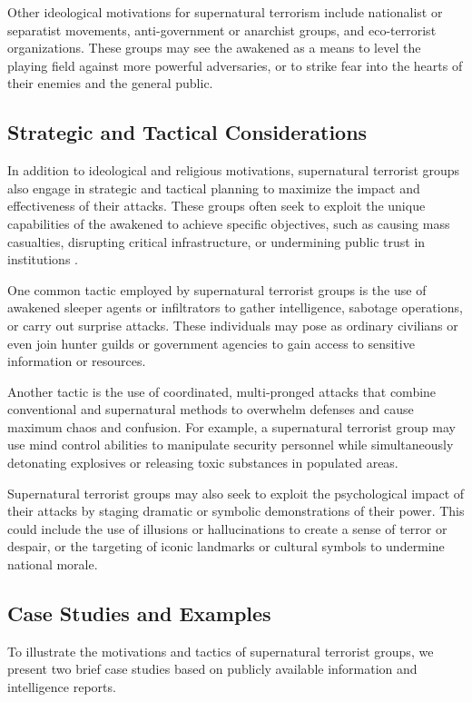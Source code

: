 \documentclass[12pt, a4paper]{article}
\begin{document}
Other ideological motivations for supernatural terrorism include nationalist or separatist movements, anti-government or anarchist groups, and eco-terrorist organizations. These groups may see the awakened as a means to level the playing field against more powerful adversaries, or to strike fear into the hearts of their enemies and the general public.

\subsection{Strategic and Tactical Considerations}
In addition to ideological and religious motivations, supernatural terrorist groups also engage in strategic and tactical planning to maximize the impact and effectiveness of their attacks. These groups often seek to exploit the unique capabilities of the awakened to achieve specific objectives, such as causing mass casualties, disrupting critical infrastructure, or undermining public trust in institutions \citep{Chen2028}.

One common tactic employed by supernatural terrorist groups is the use of awakened sleeper agents or infiltrators to gather intelligence, sabotage operations, or carry out surprise attacks. These individuals may pose as ordinary civilians or even join hunter guilds or government agencies to gain access to sensitive information or resources.

Another tactic is the use of coordinated, multi-pronged attacks that combine conventional and supernatural methods to overwhelm defenses and cause maximum chaos and confusion. For example, a supernatural terrorist group may use mind control abilities to manipulate security personnel while simultaneously detonating explosives or releasing toxic substances in populated areas.

Supernatural terrorist groups may also seek to exploit the psychological impact of their attacks by staging dramatic or symbolic demonstrations of their power. This could include the use of illusions or hallucinations to create a sense of terror or despair, or the targeting of iconic landmarks or cultural symbols to undermine national morale.

\subsection{Case Studies and Examples}
To illustrate the motivations and tactics of supernatural terrorist groups, we present two brief case studies based on publicly available information and intelligence reports.
\end{document}
